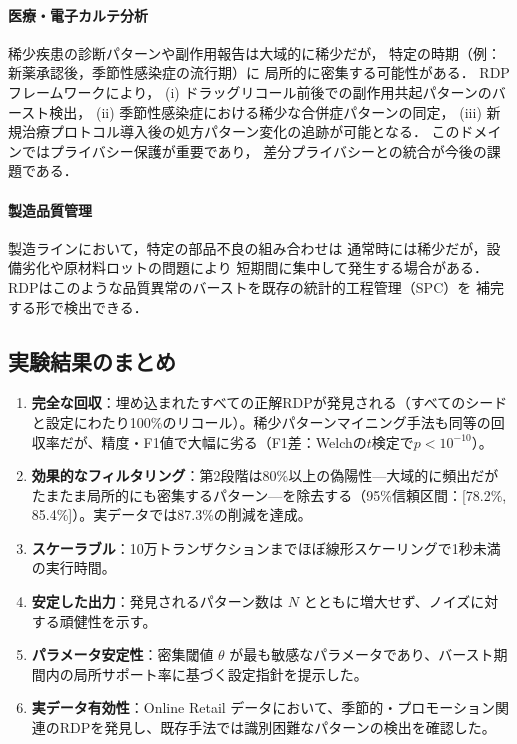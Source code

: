 \paragraph{医療・電子カルテ分析}
稀少疾患の診断パターンや副作用報告は大域的に稀少だが，
特定の時期（例：新薬承認後，季節性感染症の流行期）に
局所的に密集する可能性がある．
RDPフレームワークにより，
(i) ドラッグリコール前後での副作用共起パターンのバースト検出，
(ii) 季節性感染症における稀少な合併症パターンの同定，
(iii) 新規治療プロトコル導入後の処方パターン変化の追跡が可能となる．
このドメインではプライバシー保護が重要であり，
差分プライバシーとの統合が今後の課題である．

\paragraph{製造品質管理}
製造ラインにおいて，特定の部品不良の組み合わせは
通常時には稀少だが，設備劣化や原材料ロットの問題により
短期間に集中して発生する場合がある．
RDPはこのような品質異常のバーストを既存の統計的工程管理（SPC）を
補完する形で検出できる．

\subsection{実験結果のまとめ}

\begin{enumerate}
\item \textbf{完全な回収}：埋め込まれたすべての正解RDPが発見される（すべてのシードと設定にわたり100\%のリコール）。稀少パターンマイニング手法も同等の回収率だが、精度・F1値で大幅に劣る（F1差：Welchの$t$検定で$p < 10^{-10}$）。
\item \textbf{効果的なフィルタリング}：第2段階は80\%以上の偽陽性---大域的に頻出だがたまたま局所的にも密集するパターン---を除去する（95\%信頼区間：[78.2\%, 85.4\%]）。実データでは87.3\%の削減を達成。
\item \textbf{スケーラブル}：10万トランザクションまでほぼ線形スケーリングで1秒未満の実行時間。
\item \textbf{安定した出力}：発見されるパターン数は $N$ とともに増大せず、ノイズに対する頑健性を示す。
\item \textbf{パラメータ安定性}：密集閾値 $\theta$ が最も敏感なパラメータであり、バースト期間内の局所サポート率に基づく設定指針を提示した。
\item \textbf{実データ有効性}：Online Retail データにおいて、季節的・プロモーション関連のRDPを発見し、既存手法では識別困難なパターンの検出を確認した。
\end{enumerate}

